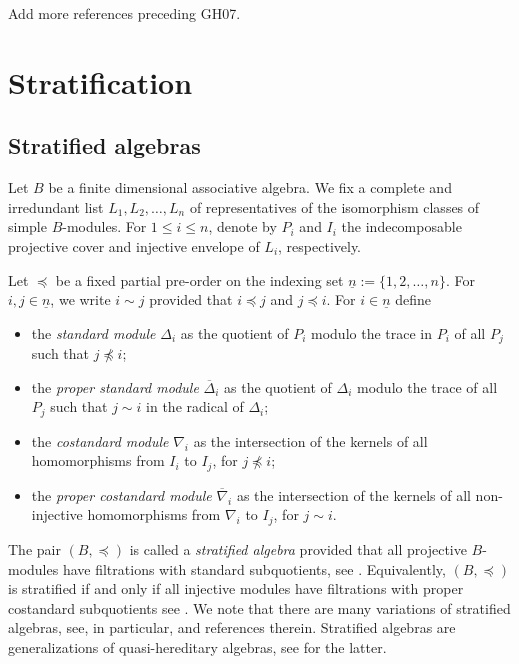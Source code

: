 \documentclass[a4paper]{amsart}
\begin{document}
{\color{red}Add more references preceding GH07.}


\section{Stratification}\label{s3}

\subsection{Stratified algebras}\label{s3.1}

Let $B$ be a finite dimensional associative algebra. We fix
a complete and irredundant list $L_1,L_2,\dots,L_n$ of representatives
of the isomorphism classes of simple $B$-modules. 
For $1\leq i\leq n$, denote by $P_i$ and $I_i$ the indecomposable 
projective cover and injective envelope of $L_i$, respectively.

Let $\preceq$ be a fixed partial pre-order on the indexing set
$\underline{n}:=\{1,2,\dots,n\}$. For $i,j\in \underline{n}$,
we write $i\sim j$ provided that $i\preceq j$ and $j\preceq i$.
For $i\in \underline{n}$
define 
\begin{itemize}
\item the {\em standard module} $\Delta_i$ as the quotient 
of $P_i$ modulo the trace in $P_i$ of all $P_j$ such that $j\not\preceq i$;
\item the {\em proper standard module} $\overline{\Delta}_i$ as the 
quotient of $\Delta_i$ modulo the trace of all $P_j$ such that 
$j\sim i$ in the radical of $\Delta_i$;
\item the {\em costandard module} $\nabla_i$ as the intersection of
the kernels of all homomorphisms from $I_i$ to $I_j$, for 
$j\not\preceq i$;
\item the {\em proper costandard module} $\overline{\nabla}_i$ as the 
intersection of the kernels of all non-injective homomorphisms from
$\nabla_i$ to $I_j$, for  $j\sim i$.
\end{itemize}
The pair $(B,\preceq)$ is called a {\em stratified algebra} 
provided that all projective $B$-modules have filtrations
with standard subquotients, see \cite{CPS}. Equivalently,
$(B,\preceq)$ is stratified if and only if all injective
modules have filtrations with proper costandard subquotients
see \cite[Theorem~1]{Fr}.
We note that there are many variations of stratified algebras,
see, in particular, \cite{Dl,Fr,BS} and references therein.
Stratified algebras are generalizations of quasi-hereditary algebras,
see \cite{CPS0,DR} for the latter.
\end{document}

